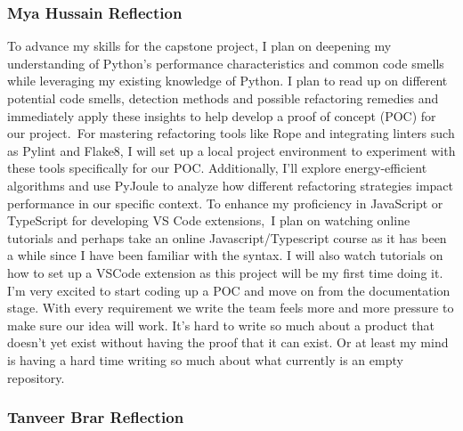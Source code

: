 \documentclass[12pt]{article}
\begin{document}
 \subsubsection*{Mya Hussain Reflection}
 To advance my skills for the capstone project, I plan on deepening my understanding of Python’s performance characteristics and common code smells while leveraging my existing knowledge of Python. I plan to read up on different potential code smells, detection methods and possible refactoring remedies and immediately apply these insights to help develop a proof of concept (POC) for our project. For mastering refactoring tools like Rope and integrating linters such as Pylint and Flake8, I will set up a local project environment to experiment with these tools specifically for our POC. Additionally, I’ll explore energy-efficient algorithms and use PyJoule to analyze how different refactoring strategies impact performance in our specific context. To enhance my proficiency in JavaScript or TypeScript for developing VS Code extensions, I plan on watching online tutorials and perhaps take an online Javascript/Typescript course as it has been a while since I have been familiar with the syntax. I will also watch tutorials on how to set up a VSCode extension as this project will be my first time doing it. I'm very excited to start coding up a POC and move on from the documentation stage. With every requirement we write the team feels more and more pressure to make sure our idea will work. It's hard to write so much about a product that doesn't yet exist without having the proof that it can exist. Or at least my mind is having a hard time writing so much about what currently is an empty repository. 

\subsubsection*{Tanveer Brar Reflection}
\medskip
\end{document}
